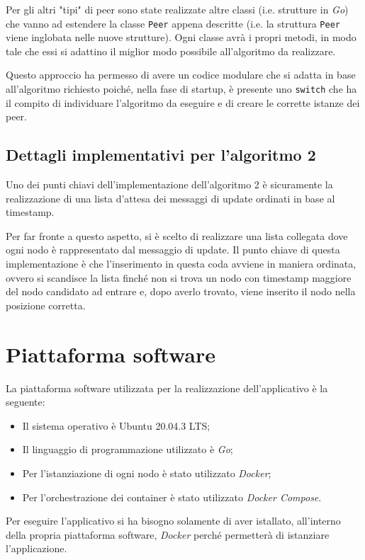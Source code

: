 \documentclass[acmtog]{acmart}
\begin{document}
Per gli altri "tipi" di peer sono state realizzate altre classi (i.e. strutture in \textit{Go}) che vanno ad estendere la classe \texttt{Peer} appena descritte (i.e. la struttura \texttt{Peer} viene inglobata nelle nuove strutture). Ogni classe avrà i propri metodi, in modo tale che essi si adattino il miglior modo possibile all'algoritmo da realizzare.

Questo approccio ha permesso di avere un codice modulare che si adatta in base all'algoritmo richiesto poiché, nella fase di startup, è presente uno \texttt{switch} che ha il compito di individuare l'algoritmo da eseguire e di creare le corrette istanze dei peer.

\subsection{Dettagli implementativi per l'algoritmo 2}
Uno dei punti chiavi dell'implementazione dell'algoritmo 2 è sicuramente la realizzazione di una lista d'attesa dei messaggi di update ordinati in base al timestamp.

Per far fronte a questo aspetto, si è scelto di realizzare una lista collegata dove ogni nodo è rappresentato dal messaggio di update. Il punto chiave di questa implementazione è che l'inserimento in questa coda avviene in maniera ordinata, ovvero si scandisce la lista finché non si trova un nodo con timestamp maggiore del nodo candidato ad entrare e, dopo averlo trovato, viene inserito il nodo nella posizione corretta.

\section{Piattaforma software}
La piattaforma software utilizzata per la realizzazione dell'applicativo è la seguente:
\begin{itemize}
\item Il sistema operativo è Ubuntu 20.04.3 LTS;
\item Il linguaggio di programmazione utilizzato è \textit{Go};
\item Per l'istanziazione di ogni nodo è stato utilizzato \textit{Docker};
\item Per l'orchestrazione dei container è stato utilizzato \textit{Docker Compose}.
\end{itemize}

Per eseguire l'applicativo si ha bisogno solamente di aver istallato, all'interno della propria piattaforma software, \textit{Docker} perché permetterà di istanziare l'applicazione. 
\end{document}
